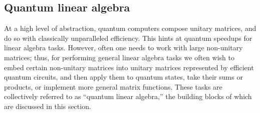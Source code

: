 
\begin{refsection}

\section{Quantum linear algebra}\label{prim:LinearAlgebra}
At a high level of abstraction, quantum computers compose unitary matrices, and do so with classically unparalleled efficiency. This hints at quantum speedups for linear algebra tasks. However, often one needs to work with large non-unitary matrices; thus, for performing general linear algebra tasks we often wish to embed certain non-unitary matrices into unitary matrices represented by efficient quantum circuits, and then apply them to quantum states, take their sums or products, or implement more general matrix functions. These tasks are collectively referred to as ``quantum linear algebra,'' the building blocks of which are discussed in this section.


\end{refsection}
